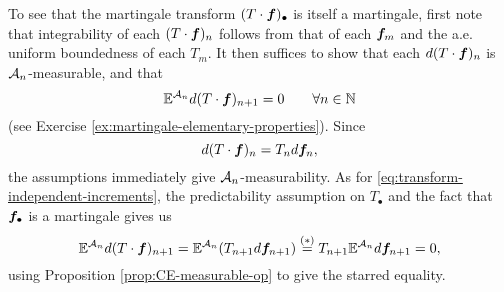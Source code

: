 To see that the martingale transform $(T \cdot \bm{f})_{\bullet}$ is itself a martingale, first note that integrability of each $(T \cdot \bm{f})_n$ follows from that of each $\bm{f}_m$ and the a.e. uniform boundedness of each $T_m$.
It then suffices to show that each $d(T\cdot \bm{f})_{n}$ is $\mathcal{A}_{n}$-measurable, and that
\begin{equation}\label{eq:transform-independent-increments}
  \mathbb{E}^{\mathcal{A}_n} d(T \cdot \bm{f})_{n+1} = 0 \qquad \forall n \in \mathbb{N}
\end{equation}
(see Exercise \ref{ex:martingale-elementary-properties}).
Since
\begin{equation*}
  d(T \cdot \bm{f})_{n} = T_{n} d\bm{f}_{n},
\end{equation*}
the assumptions immediately give $\mathcal{A}_{n}$-measurability.
As for \eqref{eq:transform-independent-increments}, the predictability assumption on $T_{\bullet}$ and the fact that $\bm{f}_{\bullet}$ is a martingale gives us
\begin{equation*}
  \mathbb{E}^{\mathcal{A}_n} d(T \cdot \bm{f})_{n+1} = \mathbb{E}^{\mathcal{A}_n} (T_{n+1} d\bm{f}_{n+1}) \stackrel{(*)}{=} T_{n+1} \mathbb{E}^{\mathcal{A}_n} d\bm{f}_{n+1} = 0,
\end{equation*}
using Proposition \ref{prop:CE-measurable-op} to give the starred equality.

